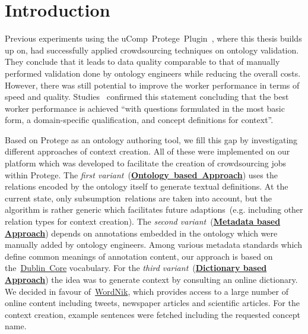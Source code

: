\section{Introduction}\label{sec:approaches_introduction}
Previous experiments using the uComp~Protege~Plugin~\cite{wohlgenannt2016}, where this thesis builds up on, had successfully applied crowdsourcing techniques on ontology validation. They conclude that it leads to data quality comparable to that of manually performed validation done by ontology engineers while reducing the overall costs. However, there was still potential to improve the worker performance in terms of speed and quality. 
Studies~\cite{mortensen2013} confirmed this statement concluding that the best worker performance is achieved
\enquote{with questions formulated in the most basic form, a domain-specific qualification, and concept definitions for context}.

Based on Protege as an ontology authoring tool, we fill this gap by investigating different approaches of context creation. All of these were implemented on our platform which was developed to facilitate the creation of crowdsourcing jobs within Protege.
The \emph{first variant}~(\hyperref[sec:enrichment_ontology_approach]{\textbf{Ontology~based~Approach}}) uses the relations encoded by the ontology itself to generate textual definitions. At the current state, only subsumption~relations are taken into account, but the algorithm is rather generic which facilitates future adaptions~(e.g. including other relation types for context creation).
The \emph{second variant}~(\hyperref[sec:enrichment_metaData_approach]{\textbf{Metadata based Approach}}) depends on annotations embedded in the ontology which were manually added by ontology engineers. Among various metadata standards which define common meanings of annotation content, our approach is based on the~\hyperref[sec:dublin_core_metadata_vocabulary]{Dublin~Core} vocabulary.
For the \emph{third variant}~(\hyperref[sec:enrichment_dictionary_approach]{\textbf{Dictionary based Approach}}) the idea was to generate context by consulting an online dictionary. We decided in favour of~\hyperref[sec:wordnik]{WordNik}, which provides access to a large number of online content including tweets, newspaper articles and scientific articles. For the context creation, example sentences were fetched including the requested concept name. 